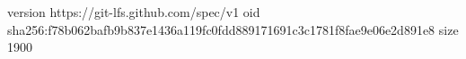 version https://git-lfs.github.com/spec/v1
oid sha256:f78b062bafb9b837e1436a119fc0fdd889171691c3c1781f8fae9e06e2d891e8
size 1900
